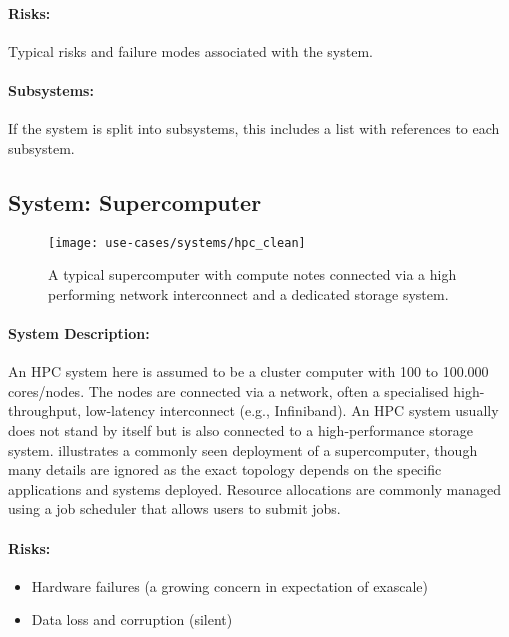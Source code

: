 \paragraph{Risks:} Typical risks and failure modes associated with the system.
\paragraph{Subsystems:} If the system is split into subsystems, this includes a list with references to each subsystem.

\subsection{System: Supercomputer}
\label{System: Supercomputer}

\begin{figure}
	\centering
	\texttt{[image: use-cases/systems/hpc\_clean]}
	\caption{A typical supercomputer with compute notes connected via a high performing network interconnect and a dedicated storage system.}
	\label{fig:system supercomputer}
\end{figure}


\paragraph{System Description:}
An HPC system here is assumed to be a cluster computer with 100 to 100.000 cores/nodes.
The nodes are connected via a network, often a specialised high-throughput, low-latency interconnect (e.g., Infiniband). An HPC system usually does not stand by itself but is also connected to a high-performance storage system.
 illustrates a commonly seen deployment of a supercomputer, though many details are ignored as the exact topology depends on the specific applications and systems deployed.
Resource allocations are commonly managed using a job scheduler that allows users to submit jobs.


\paragraph{Risks:}
\begin{itemize}
	\item Hardware failures (a growing concern in expectation of exascale)
	\item Data loss and corruption (silent)
\end{itemize}


